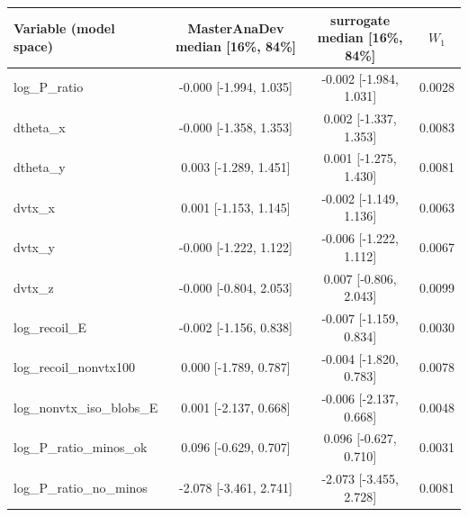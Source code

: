 \begin{tabular}{lccc}
\toprule
Variable (model space) & MasterAnaDev median [16\%, 84\%] & surrogate median [16\%, 84\%] & $W_1$ \\
\midrule
log\_P\_ratio & -0.000 [-1.994, 1.035] & -0.002 [-1.984, 1.031] & 0.0028 \\
dtheta\_x & -0.000 [-1.358, 1.353] & 0.002 [-1.337, 1.353] & 0.0083 \\
dtheta\_y & 0.003 [-1.289, 1.451] & 0.001 [-1.275, 1.430] & 0.0081 \\
dvtx\_x & 0.001 [-1.153, 1.145] & -0.002 [-1.149, 1.136] & 0.0063 \\
dvtx\_y & -0.000 [-1.222, 1.122] & -0.006 [-1.222, 1.112] & 0.0067 \\
dvtx\_z & -0.000 [-0.804, 2.053] & 0.007 [-0.806, 2.043] & 0.0099 \\
log\_recoil\_E & -0.002 [-1.156, 0.838] & -0.007 [-1.159, 0.834] & 0.0030 \\
log\_recoil\_nonvtx100 & 0.000 [-1.789, 0.787] & -0.004 [-1.820, 0.783] & 0.0078 \\
log\_nonvtx\_iso\_blobs\_E & 0.001 [-2.137, 0.668] & -0.006 [-2.137, 0.668] & 0.0048 \\
log\_P\_ratio\_minos\_ok & 0.096 [-0.629, 0.707] & 0.096 [-0.627, 0.710] & 0.0031 \\
log\_P\_ratio\_no\_minos & -2.078 [-3.461, 2.741] & -2.073 [-3.455, 2.728] & 0.0081 \\
\bottomrule
\end{tabular}
